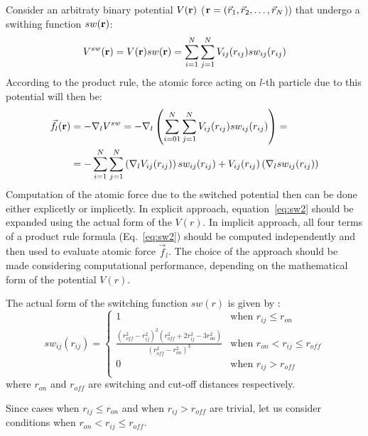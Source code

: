 \documentclass[11pt]{book}
\begin{document}
Consider an arbitraty binary potential $V({\bf r})$ (${\bf r}=(\vec{r}_{1},\vec{r}_{2},\ldots,\vec{r}_{N}$)) that undergo a swithing function $sw({\bf r})$:
\begin{equation}\label{eq:sw1}
V^{sw}({\bf r})=V({\bf r})sw({\bf r})=\sum_{i=1}^{N}\sum_{j=1}^{N}V_{ij}(r_{ij})sw_{ij}(r_{ij})
\end{equation}
According to the product rule, the atomic force acting on $l$-th particle due to this potential will then be:
\begin{equation}\label{eq:sw2}
\begin{split}
\vec{f}_{l}({\bf r})&=-\nabla_{l} V^{sw}=-\nabla_{l}\left(\sum_{i=01}^{N}\sum_{j=1}^{N}V_{ij}(r_{ij})sw_{ij}(r_{ij})\right)=\\
&=-\sum_{i=1}^{N}\sum_{j=1}^{N}\left(\nabla_{l}V_{ij}(r_{ij})\right)sw_{ij}(r_{ij})+V_{ij}(r_{ij})\left(\nabla_{l}sw_{ij}(r_{ij})\right)
\end{split}
\end{equation}
Computation of the atomic force due to the switched potential then can be done either explicetly or implicetly. In explicit approach, equation~\ref{eq:sw2} should be expanded using the actual form of the $V(r)$. In implicit approach, all four terms of a product rule formula (Eq.~\ref{eq:sw2}) should be computed independently and then used to evaluate atomic force $\vec{f}_{l}$. The choice of the approach should be made considering computational performance, depending on the mathematical form of the potential $V(r)$.

The actual form of the switching function $sw(r)$ is given by \cite{Charmm83}:
\begin{equation}\label{eq:sw}
sw_{ij}(r_{ij})=
\begin{cases}
	1 & \text{when } r_{ij}\leq r_{on}\\
	\frac{\left(r_{off}^{2}-r_{ij}^{2}\right)^{2}\left(r_{off}^{2}+2r_{ij}^{2}-3r_{on}^{2}\right)}{\left(r_{off}^{2}-r_{on}^{2}\right)^{3}} & \text{when } r_{on}<r_{ij}\leq r_{off}\\
	0 & \text{when } r_{ij}>r_{off}\\
\end{cases}
\end{equation}
where $r_{on}$ and $r_{off}$ are switching and cut-off distances respectively.

Since cases when $r_{ij}\leq r_{on}$ and when $r_{ij}>r_{off}$ are trivial, let us consider conditions when $r_{on}<r_{ij}\leq r_{off}$.
\end{document}
